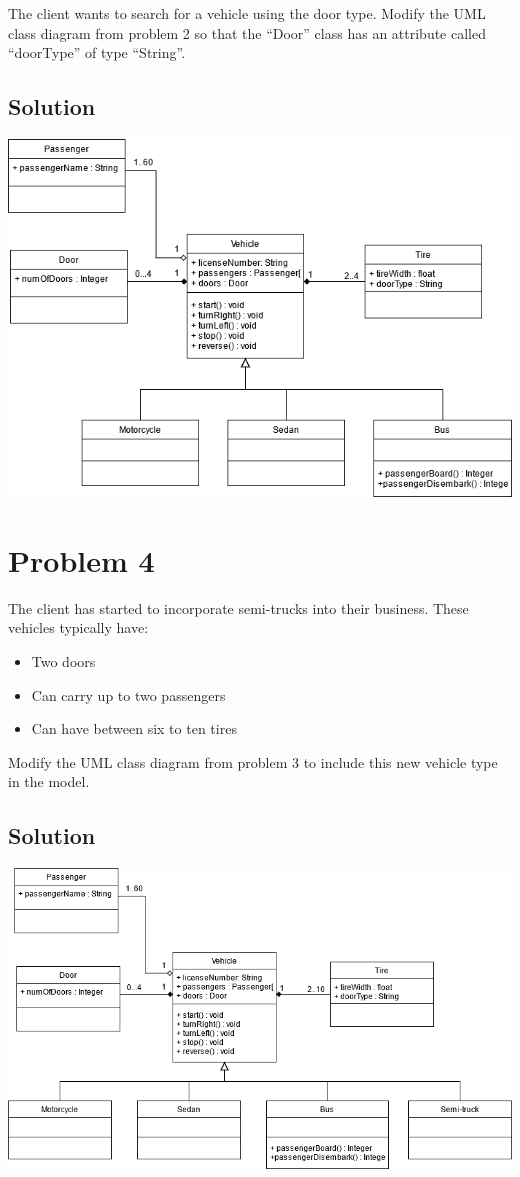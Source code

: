 \documentclass{article}
\begin{document}
    The client wants to search for a vehicle using the door type. Modify the UML 
    class diagram from problem 2 so that the “Door” class
    has an attribute called “doorType” of type “String”.

    \subsection*{Solution}

    \begin{center}
        \includegraphics[scale=0.55]{E3_Q3.png}
    \end{center}


    \section*{Problem 4}

    The client has started to incorporate semi-trucks into their business. These vehicles
    typically have:
    \begin{itemize}
        \item 
        Two doors
        \item
        Can carry up to two passengers
        \item
        Can have between six to ten tires
    \end{itemize}
    Modify the UML class diagram from problem 3 to include this new vehicle type in the
    model.

    \subsection*{Solution}

    \begin{center}
        \includegraphics[scale=0.55]{E3_Q4.png}
    \end{center}
\end{document}
